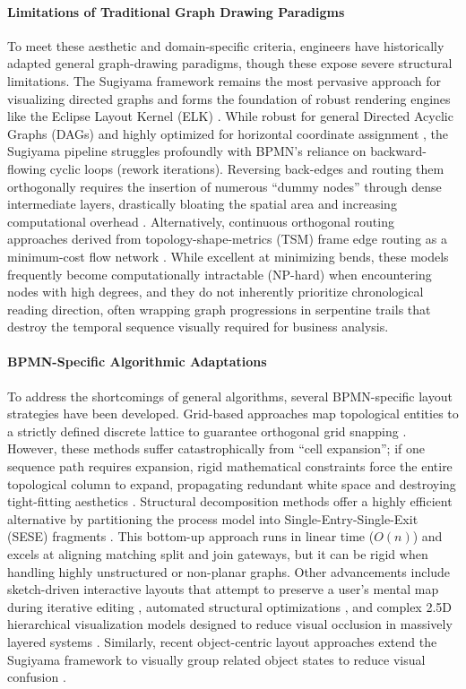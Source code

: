 \documentclass[fleqn,10pt]{wlscirep}
\begin{document}
\paragraph{Limitations of Traditional Graph Drawing Paradigms}
To meet these aesthetic and domain-specific criteria, engineers have historically adapted general graph-drawing paradigms, though these expose severe structural limitations. The Sugiyama framework remains the most pervasive approach for visualizing directed graphs and forms the foundation of robust rendering engines like the Eclipse Layout Kernel (ELK) \cite{ref_sugiyama, ref_gansner, ref_kasperowski}. While robust for general Directed Acyclic Graphs (DAGs) and highly optimized for horizontal coordinate assignment \cite{ref_brandes}, the Sugiyama pipeline struggles profoundly with BPMN's reliance on backward-flowing cyclic loops (rework iterations). Reversing back-edges and routing them orthogonally requires the insertion of numerous ``dummy nodes'' through dense intermediate layers, drastically bloating the spatial area and increasing computational overhead \cite{ref_sugiyama, ref_gansner}. Alternatively, continuous orthogonal routing approaches derived from topology-shape-metrics (TSM) frame edge routing as a minimum-cost flow network \cite{ref_tamassia}. While excellent at minimizing bends, these models frequently become computationally intractable (NP-hard) when encountering nodes with high degrees, and they do not inherently prioritize chronological reading direction, often wrapping graph progressions in serpentine trails that destroy the temporal sequence visually required for business analysis.

\paragraph{BPMN-Specific Algorithmic Adaptations}
To address the shortcomings of general algorithms, several BPMN-specific layout strategies have been developed. Grid-based approaches map topological entities to a strictly defined discrete lattice to guarantee orthogonal grid snapping \cite{ref_kitzmann}. However, these methods suffer catastrophically from ``cell expansion''; if one sequence path requires expansion, rigid mathematical constraints force the entire topological column to expand, propagating redundant white space and destroying tight-fitting aesthetics \cite{ref_kitzmann}. Structural decomposition methods offer a highly efficient alternative by partitioning the process model into Single-Entry-Single-Exit (SESE) fragments \cite{ref_gschwind}. This bottom-up approach runs in linear time ($O(n)$) and excels at aligning matching split and join gateways, but it can be rigid when handling highly unstructured or non-planar graphs. Other advancements include sketch-driven interactive layouts that attempt to preserve a user's mental map during iterative editing \cite{ref_effinger_interactive, ref_effinger_study}, automated structural optimizations \cite{ref_contreras}, and complex 2.5D hierarchical visualization models designed to reduce visual occlusion in massively layered systems \cite{ref_hong}. Similarly, recent object-centric layout approaches extend the Sugiyama framework to visually group related object states to reduce visual confusion \cite{ref_pads}.
\end{document}
